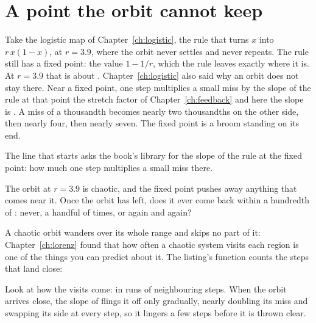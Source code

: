\section{A point the orbit cannot keep}
\label{sec:ch17-point}

\noindent
Take the logistic map of Chapter~\ref{ch:logistic}, the rule that turns $x$
into $r\,x(1 - x)$, at $r = \num{3.9}$, where the orbit never settles and
never repeats. The rule still has a fixed point: the value $1 - 1/r$, which
the rule leaves exactly where it is. At $r = \num{3.9}$ that is about
. Chapter~\ref{ch:logistic} also said why an orbit does not
stay there. Near a fixed point, one step multiplies a small miss by the slope
of the rule at that point \dash{} the stretch factor of
Chapter~\ref{ch:feedback} \dash{} and here the slope is . A
miss of a thousandth becomes nearly two thousandths on the other side, then
nearly four, then nearly seven. The fixed point is a broom standing on its
end.


\noindent
The line that starts  asks the book's library for the slope of
the rule at the fixed point: how much one step multiplies a small miss there.

\begin{think}
The orbit at $r = \num{3.9}$ is chaotic, and the fixed point pushes away
anything that comes near it. Once the orbit has left, does it ever come back
within a hundredth of : never, a handful of times, or again
and again?
\end{think}
A chaotic orbit wanders over its whole range and skips no part of it:
Chapter~\ref{ch:lorenz} found that how often a chaotic system visits each
region is one of the things you can predict about it. The listing's function
 counts the steps that land close:


\noindent
Look at how the visits come: in runs of neighbouring steps. When the orbit
arrives close, the slope of  flings it off only gradually,
nearly doubling its miss and swapping its side at every step, so it lingers
a few steps before it is thrown clear.

